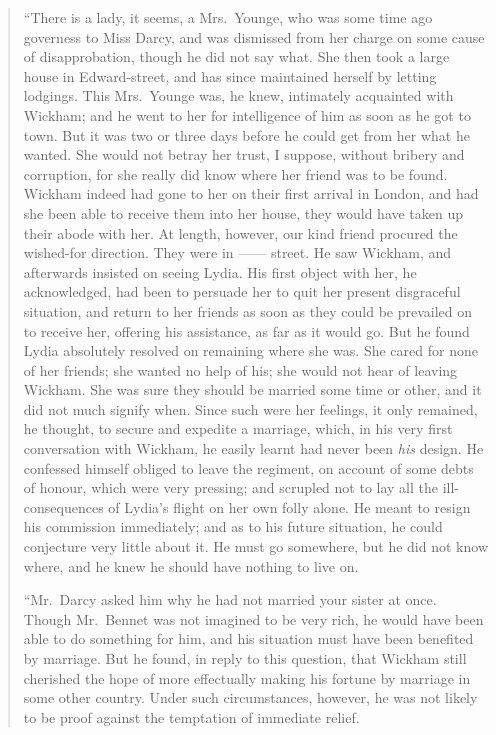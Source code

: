 \documentclass[12pt,english,oneside]{book}
\begin{document}
\begin{quotation}
{}``There is a lady, it seems, a Mrs.\ Younge, who was some time
ago governess to Miss Darcy, and was dismissed from her charge on
some cause of disapprobation, though he did not say what. She then
took a large house in Edward-street, and has since maintained herself
by letting lodgings. This Mrs.\ Younge was, he knew, intimately acquainted
with Wickham; and he went to her for intelligence of him as soon as
he got to town. But it was two or three days before he could get from
her what he wanted. She would not betray her trust, I suppose, without
bribery and corruption, for she really did know where her friend was
to be found. Wickham indeed had gone to her on their first arrival
in London, and had she been able to receive them into her house, they
would have taken up their abode with her. At length, however, our
kind friend procured the wished-for direction. They were in \mbox{------}
street. He saw Wickham, and afterwards insisted on seeing Lydia. His
first object with her, he acknowledged, had been to persuade her to
quit her present disgraceful situation, and return to her friends
as soon as they could be prevailed on to receive her, offering his
assistance, as far as it would go. But he found Lydia absolutely resolved
on remaining where she was. She cared for none of her friends; she
wanted no help of his; she would not hear of leaving Wickham. She
was sure they should be married some time or other, and it did not
much signify when. Since such were her feelings, it only remained,
he thought, to secure and expedite a marriage, which, in his very
first conversation with Wickham, he easily learnt had never been \textit{his}
design. He confessed himself obliged to leave the regiment, on account
of some debts of honour, which were very pressing; and scrupled not
to lay all the ill-consequences of Lydia's flight on her own folly
alone. He meant to resign his commission immediately; and as to his
future situation, he could conjecture very little about it. He must
go somewhere, but he did not know where, and he knew he should have
nothing to live on.

{}``Mr.\ Darcy asked him why he had not married your sister at once.
Though Mr.\ Bennet was not imagined to be very rich, he would have
been able to do something for him, and his situation must have been
benefited by marriage. But he found, in reply to this question, that
Wickham still cherished the hope of more effectually making his fortune
by marriage in some other country. Under such circumstances, however,
he was not likely to be proof against the temptation of immediate
relief.


\end{quotation}
\end{document}
